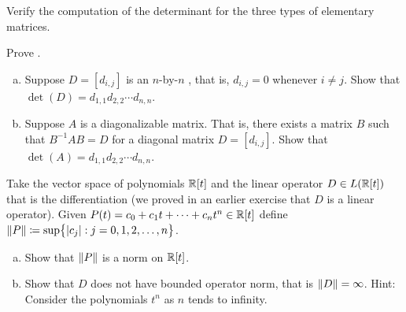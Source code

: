\begin{exercise}
Verify the computation of the determinant for the three types of 
elementary matrices.
\end{exercise}

\begin{exercise}
Prove .
\end{exercise}

\begin{exercise}
\leavevmode
\begin{enumerate}[a)]
\item
Suppose $D = [d_{i,j}]$ is an $n$-by-$n$ \emph{}, that is, $d_{i,j} = 0$ whenever $i
\not= j$.  Show that $\det(D) = d_{1,1}d_{2,2} \cdots d_{n,n}$.
\item
Suppose $A$ is a diagonalizable matrix.  That is, there exists a matrix
$B$ such that $B^{-1}AB = D$ for a diagonal matrix $D = [d_{i,j}]$.  Show
that $\det(A) = d_{1,1}d_{2,2} \cdots d_{n,n}$.
\end{enumerate}
\end{exercise}

\begin{exercise}
\pagebreak[1]
Take the vector space of polynomials ${\mathbb{R}}[t]$ and the linear operator $D \in
L({\mathbb{R}}[t])$ that is
the differentiation (we proved in an earlier exercise that $D$ is a linear
operator).  Given $P(t) = c_0 + c_1 t + \cdots + c_n
t^n \in {\mathbb{R}}[t]$ define $\lVert {P} \rVert \coloneqq \sup \bigl\{ \lvert {c_j} \rvert : j = 0,1,2,\ldots,n \bigr\}$.
\begin{enumerate}[a)]
\item
Show that $\lVert {P} \rVert$ is a norm on ${\mathbb{R}}[t]$.
\item
Show that $D$ does not have bounded operator norm, that is $\lVert {D} \rVert =
\infty$.  Hint: Consider the polynomials $t^n$ as $n$ tends to infinity.
\end{enumerate}
\end{exercise}

